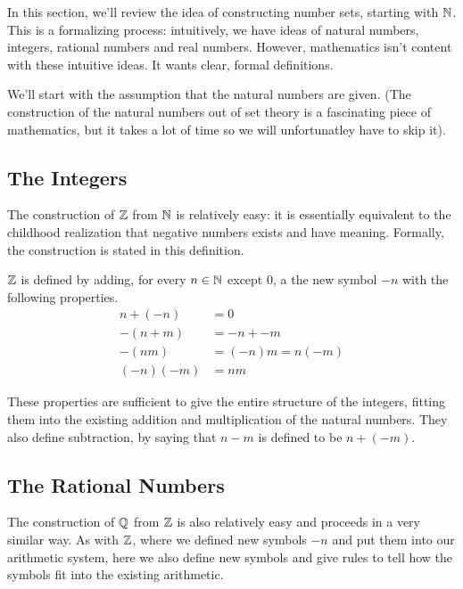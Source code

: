 \documentclass[fleqn]{report}
\begin{document}
In this section, we'll review the idea of constructing number
sets, starting with $\mathbb{N}$. This is a formalizing
process: intuitively, we have ideas of natural numbers,
integers, rational numbers and real numbers. However,
mathematics isn't content with these intuitive ideas. It
wants clear, formal definitions.

We'll start with the assumption that the natural numbers are
given. (The construction of the natural numbers out of set
theory is a fascinating piece of mathematics, but it takes a
lot of time so we will unfortunatley have to skip it).

\subsection{The Integers}
\label{integers}

The construction of $\mathbb{Z}$ from $\mathbb{N}$ is relatively easy: it is
essentially equivalent to the childhood realization that
negative numbers exists and have meaning. Formally, the
construction is stated in this definition.

\begin{defn}
$\mathbb{Z}$ is defined by adding, for every $n \in \mathbb{N}$ except
$0$, a the new symbol $-n$ with the following properties.
\begin{align*}
n + (-n) & = 0 \\
-(n + m) & = -n + -m \\
-(nm) & = (-n)m = n(-m) \\
(-n)(-m) & = nm
\end{align*}
\end{defn}

These properties are sufficient to give the entire
structure of the integers, fitting them into the existing
addition and multiplication of the natural numbers. They also
define subtraction, by saying that $n-m$ is defined to be $n +
(-m)$. 

\subsection{The Rational Numbers}
\label{rationals}

The construction of $\mathbb{Q}$ from $\mathbb{Z}$ is also relatively easy
and proceeds in a very similar way. As with $\mathbb{Z}$, where we
defined new symbols $-n$ and put them into our arithmetic
system, here we also define new symbols and give rules to tell
how the symbols fit into the existing arithmetic.
\end{document}

